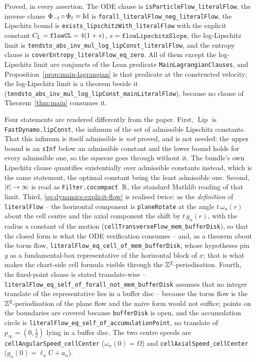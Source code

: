 Proved, in every assertion.  The ODE clause is
\texttt{isParticleFlow\_literalFlow}, the inverse clause
$\Phi_{-t}\circ\Phi_t=\mathrm{Id}$ is \texttt{forall\_literalFlow\_neg\_literalFlow}, the Lipschitz
bound is \texttt{exists\_lipschitzWith\_literalFlow} with the explicit constant
$C_{\rm L}=\texttt{flowCL}=4(1+s)$, $s=\texttt{flowLipschitzSlope}$, the log-Lipschitz limit
is \texttt{tendsto\_abs\_inv\_mul\_log\_lipConst\_literalFlow}, and the entropy clause is
\texttt{coverEntropy\_literalFlow\_eq\_zero}.  All of them except the log-Lipschitz limit are
conjuncts of the Lean predicate \texttt{MainLagrangianClauses}, and
Proposition~\ref{prop:main-lagrangian} is that predicate at the constructed velocity; the
log-Lipschitz limit is a theorem beside it
(\texttt{tendsto\_abs\_inv\_mul\_log\_lipConst\_mainLiteralFlow}), because no clause of
Theorem~\ref{thm:main} consumes it.

Four statements are rendered differently from the paper.  First,
$\operatorname{Lip}$ is \texttt{FastDynamo.lipConst}, the infimum of the set of admissible
Lipschitz constants.  That this infimum is itself admissible is \emph{not} proved, and is not
needed: the upper bound is an \texttt{sInf} below an admissible constant and the lower bound
holds for every admissible one, so the squeeze goes through without it.  The bundle's own
Lipschitz clause quantifies existentially over admissible constants instead, which is the
same statement, the optimal constant being the least admissible one.  Second, $\left\lvert t\right\rvert\to\infty$
is read as \texttt{Filter.cocompact}~$\mathbb{R}$, the standard Mathlib reading of that limit.
Third, \eqref{eq:dynamics:explicit-flow} is realised twice: as the \emph{definition} of
\texttt{literalFlow} -- the horizontal component is \texttt{planeRotate} at the angle
$t\,\omega_n(r)$ about the cell centre and the axial component the shift by $t\,g_n(r)$,
with the radius a constant of the motion
(\texttt{cellTransverseFlow\_mem\_bufferDisk}), so that the closed form is what the ODE
verification consumes -- and, as a theorem about the torus flow,
\texttt{literalFlow\_eq\_cell\_of\_mem\_bufferDisk}, whose hypotheses pin $y$ as a
fundamental-box representative of the horizontal block of $x$; that is what makes the
chart-side cell formula visible through the $\mathbb{Z}^2$-periodisation.  Fourth, the fixed-point
clause is stated translate-wise --
\texttt{literalFlow\_eq\_self\_of\_forall\_not\_mem\_bufferDisk} assumes that no integer
translate of the representative lies in a buffer disc -- because the torus flow is the
$\mathbb{Z}^2$-periodisation of the plane flow and the naive form would not suffice; points on the
boundaries are covered because \texttt{bufferDisk} is open, and the accumulation circle is
\texttt{literalFlow\_eq\_self\_of\_accumulationPoint}, no translate of
$p_\infty=(0,\tfrac12)$ lying in a buffer disc.  The two centre speeds are
\texttt{cellAngularSpeed\_cellCenter} ($\omega_n(0)=\Omega$) and
\texttt{cellAxialSpeed\_cellCenter} ($g_n(0)=\ell_nU+a_n$).

